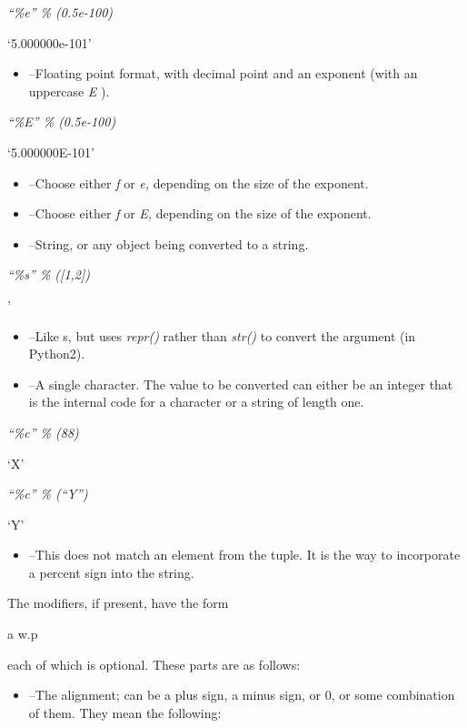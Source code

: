 \emph{``\%e'' \% (0.5e-100)}

`5.000000e-101'

\begin{itemize}

\item
   --Floating point
  format, with decimal point and an exponent (with an uppercase \emph{E}
  ).
\end{itemize}


\emph{``\%E'' \% (0.5e-100)}

`5.000000E-101'

\begin{itemize}

\item
   --Choose either
  \emph{f} or \emph{e,} depending on the size of the exponent.
\item
   --Choose either
  \emph{f} or \emph{E,} depending on the size of the exponent.
\item
   --String, or any object
  being converted to a string.
\end{itemize}


\emph{``\%s'' \% ({[}1,2{]})}

'

\begin{itemize}

\item
   --Like s, but uses
  \emph{repr()} rather than \emph{str()} to convert the argument (in
  Python2).
\item
   --A single character.
  The value to be converted can either be an integer that is the
  internal code for a character or a string of length one.
\end{itemize}


\emph{``\%c'' \% (88)}

`X'


\emph{``\%c'' \% (``Y'')}

`Y'

\begin{itemize}

\item
   --This does not match
  an element from the tuple. It is the way to incorporate a percent sign
  into the string.
\end{itemize}

The modifiers, if present, have the
form

a w.p

each of which is optional. These
parts are as follows:

\begin{itemize}

\item
   --The alignment; can be
  a plus sign, a minus sign, or 0, or some combination of them. They
  mean the following:
\end{itemize}

